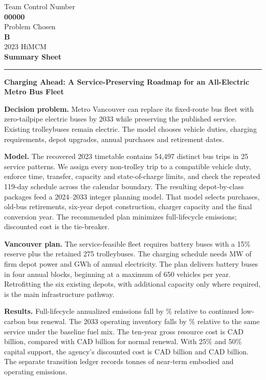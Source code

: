 \documentclass[12pt,letterpaper]{article}
\begin{document}
\begin{center}
Team Control Number\\
{\Large\bfseries 00000}\\[3pt]
Problem Chosen\\
{\Large\bfseries B}\\[3pt]
2023 HiMCM\\
\textbf{Summary Sheet}
\end{center}
\hrule
\vspace{0.5em}
\begin{center}
{\Large\bfseries Charging Ahead: A Service-Preserving Roadmap for an All-Electric Metro Bus Fleet}
\end{center}

\textbf{Decision problem.} Metro Vancouver can replace its fixed-route bus fleet with zero-tailpipe electric buses by 2033 while preserving the published service. Existing trolleybuses remain electric. The model chooses vehicle duties, charging requirements, depot upgrades, annual purchases and retirement dates.

\textbf{Model.} The recovered 2023 timetable contains 54,497 distinct bus trips in 25 service patterns. We assign every non-trolley trip to a compatible vehicle duty, enforce time, transfer, capacity and state-of-charge limits, and check the repeated 119-day schedule across the calendar boundary. The resulting depot-by-class packages feed a 2024--2033 integer planning model. That model selects purchases, old-bus retirements, six-year depot construction, charger capacity and the final conversion year. The recommended plan minimizes full-lifecycle emissions; discounted cost is the tie-breaker.

\textbf{Vancouver plan.} The service-feasible fleet requires  battery buses with a 15\% reserve plus the retained 275 trolleybuses. The charging schedule needs  MW of firm depot power and  GWh of annual electricity. The plan delivers  battery buses in four annual blocks, beginning at a maximum of 650 vehicles per year. Retrofitting the six existing depots, with additional capacity only where required, is the main infrastructure pathway.

\textbf{Results.} Full-lifecycle annualized emissions fall by \% relative to continued low-carbon bus renewal. The 2033 operating inventory falls by \% relative to the same service under the baseline fuel mix. The ten-year gross resource cost is CAD  billion, compared with CAD  billion for normal renewal. With 25\% and 50\% capital support, the agency's discounted cost is CAD  billion and CAD  billion. The separate transition ledger records  tonnes of near-term embodied and operating emissions.
\end{document}
